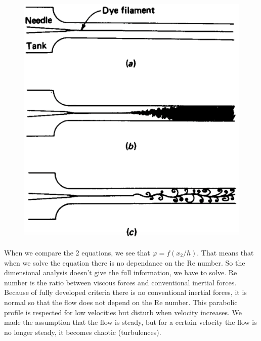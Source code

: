 	 	\begin{figure}
		\vspace{-5mm}
		\includegraphics[scale=0.2]{ch4/5}
		\end{figure}
		When we compare the 2 equations, we see that $\varphi = f(x_2/h)$. That means that when we solve the equation there is no dependance on the Re number. So the dimensional analysis doesn't give the full information, we have to solve. Re number is the ratio between viscous forces and conventional inertial forces. Because of fully developed criteria there is no conventional inertial forces, it is normal so that the flow does not depend on the Re number. This parabolic profile is respected for low velocities but disturb when velocity increases. We made the assumption that the flow is steady, but for a certain velocity the flow is no longer steady, it becomes chaotic (turbulences). 
		

